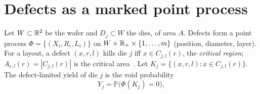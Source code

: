 \documentclass[10pt,twocolumn]{article}
\newcommand{\Prob}{\mathbb{P}}
\begin{document}
\maketitle

\begin{abstract}
\noindent We formulate die yield as the void probability of a marked point process of defects restricted to the critical region of a layout. Under a Poisson law this gives the exact model $Y=e^{-\lambda}$, where $\lambda$ is the defect density times the size-averaged critical area, not the die area. Clustering is modelled by a Cox process: yield becomes a Laplace functional, which contains the Murphy, Seeds and negative binomial models as particular mixing laws and is never below the Poisson yield. We show that the clustering parameter is not intrinsic: it depends on the scale of the mixing relative to the die, and only large-scale mixing correlates neighbouring dies. A log-Gaussian Cox model with lot, wafer, radial and Mat\'ern spatial effects plus a systematic component leads to a complementary log-log mixed model, derived rather than assumed. We give identifiability conditions, the law of good dies per wafer and a Bayesian inference procedure.
\end{abstract}

\section{Defects as a marked point process}
Let $W\subset\mathbb{R}^2$ be the wafer and $D_j\subset W$ the dies, of area $A$. Defects form a point process $\Phi=\{(X_i,R_i,L_i)\}$ on $W\times\mathbb{R}_+\times\{1,\dots,m\}$ (position, diameter, layer). For a layout, a defect $(x,r,l)$ kills die $j$ iff $x\in C_{j,l}(r)$, the \emph{critical region}; $A_{c,l}(r)=|C_{j,l}(r)|$ is the critical area~\cite{stapper1984,maly1985}. Let $K_j=\{(x,r,l):x\in C_{j,l}(r)\}$. The defect-limited yield of die $j$ is the void probability
\begin{equation}
Y_j=\Prob\big(\Phi(K_j)=0\big),
\end{equation}
\end{document}

